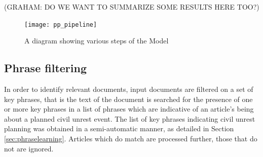 (GRAHAM: DO WE WANT TO SUMMARIZE SOME RESULTS HERE TOO?)

%

%



\begin{figure}
\texttt{[image: pp\_pipeline]}
\caption{A diagram showing various steps of the Model}
\end{figure}

\subsection{Phrase filtering}

In order to identify relevant documents, input documents are filtered on a set of key phrases, that is 
the text of the document is searched for the presence of one or
more key phrases in a list of phrases which are indicative of an article's being
about a planned civil unrest event.  
The list of key phrases indicating civil unrest planning was obtained
in a semi-automatic manner, as detailed in Section \ref{sec:phraselearning}.
Articles which do match are processed further, those that do not are ignored.


